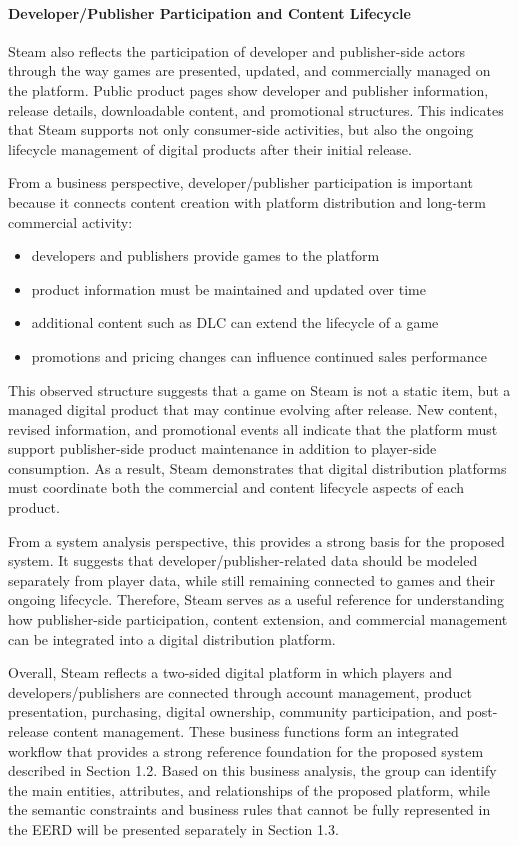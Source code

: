 \paragraph{Developer/Publisher Participation and Content Lifecycle}
Steam also reflects the participation of developer and publisher-side actors through the way games are presented, updated, and commercially managed on the platform. Public product pages show developer and publisher information, release details, downloadable content, and promotional structures. This indicates that Steam supports not only consumer-side activities, but also the ongoing lifecycle management of digital products after their initial release.

From a business perspective, developer/publisher participation is important because it connects content creation with platform distribution and long-term commercial activity:
\begin{itemize}
    \item developers and publishers provide games to the platform
    \item product information must be maintained and updated over time
    \item additional content such as DLC can extend the lifecycle of a game
    \item promotions and pricing changes can influence continued sales performance
\end{itemize}

This observed structure suggests that a game on Steam is not a static item, but a managed digital product that may continue evolving after release. New content, revised information, and promotional events all indicate that the platform must support publisher-side product maintenance in addition to player-side consumption. As a result, Steam demonstrates that digital distribution platforms must coordinate both the commercial and content lifecycle aspects of each product.

From a system analysis perspective, this provides a strong basis for the proposed system. It suggests that developer/publisher-related data should be modeled separately from player data, while still remaining connected to games and their ongoing lifecycle. Therefore, Steam serves as a useful reference for understanding how publisher-side participation, content extension, and commercial management can be integrated into a digital distribution platform.

\vspace{0.5em}
\par\vspace{0.3em}
Overall, Steam reflects a two-sided digital platform in which players and developers/publishers are connected through account management, product presentation, purchasing, digital ownership, community participation, and post-release content management. These business functions form an integrated workflow that provides a strong reference foundation for the proposed system described in Section 1.2. Based on this business analysis, the group can identify the main entities, attributes, and relationships of the proposed platform, while the semantic constraints and business rules that cannot be 
fully represented in the EERD will be presented separately in Section 1.3.
\newpage